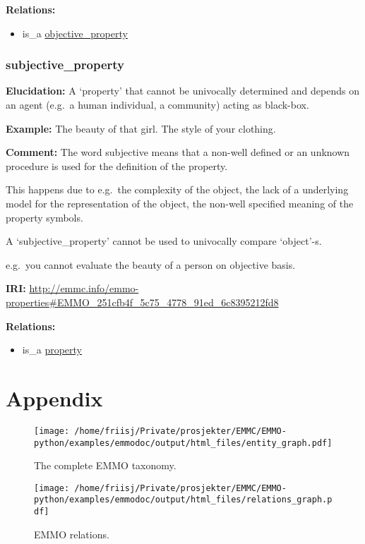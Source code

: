 \documentclass[a4paper,]{report}
\providecommand{\tightlist}{%
  \setlength{\itemsep}{0pt}\setlength{\parskip}{0pt}}
\begin{document}
\textbf{Relations:}

\begin{itemize}
\tightlist
\item
  is\_a \protect\hyperlink{objective_property}{objective\_property}
\end{itemize}

\hypertarget{subjective_property}{%
\subsection{subjective\_property}\label{subjective_property}}

\textbf{Elucidation:} A `property' that cannot be univocally determined
and depends on an agent (e.g.~a human individual, a community) acting as
black-box.

\textbf{Example:} The beauty of that girl. The style of your clothing.

\textbf{Comment:} The word subjective means that a non-well defined or
an unknown procedure is used for the definition of the property.

This happens due to e.g.~the complexity of the object, the lack of a
underlying model for the representation of the object, the non-well
specified meaning of the property symbols.

A `subjective\_property' cannot be used to univocally compare
`object'-s.

e.g.~you cannot evaluate the beauty of a person on objective basis.

\textbf{IRI:}
\url{http://emmc.info/emmo-properties\#EMMO_251cfb4f_5c75_4778_91ed_6c8395212fd8}

\textbf{Relations:}

\begin{itemize}
\tightlist
\item
  is\_a \protect\hyperlink{property}{property}
\end{itemize}

\hypertarget{appendix}{%
\chapter{Appendix}\label{appendix}}

\begin{figure}
\centering
\texttt{[image: /home/friisj/Private/prosjekter/EMMC/EMMO-python/examples/emmodoc/output/html\_files/entity\_graph.pdf]}
\caption{The complete EMMO taxonomy.}
\end{figure}

\begin{figure}
\centering
\texttt{[image: /home/friisj/Private/prosjekter/EMMC/EMMO-python/examples/emmodoc/output/html\_files/relations\_graph.pdf]}
\caption{EMMO relations.}
\end{figure}
\end{document}
